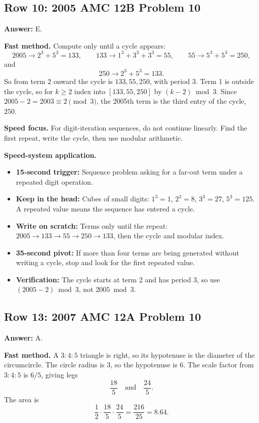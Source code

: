 \documentclass[11pt]{article}
\begin{document}
\subsection{Row 10: 2005 AMC 12B Problem 10}

\textbf{Answer:} E.

\textbf{Fast method.} Compute only until a cycle appears:
\[
2005\to 2^3+5^3=133,\qquad
133\to 1^3+3^3+3^3=55,\qquad
55\to 5^3+5^3=250,
\]
and
\[
250\to 2^3+5^3=133.
\]
So from term 2 onward the cycle is \(133,55,250\), with period 3. Term 1 is outside the cycle, so for \(k\ge2\) index into \([133,55,250]\) by \((k-2)\bmod 3\). Since \(2005-2=2003\equiv2\pmod3\), the 2005th term is the third entry of the cycle, \(250\).

\textbf{Speed focus.} For digit-iteration sequences, do not continue linearly. Find the first repeat, write the cycle, then use modular arithmetic.

\textbf{Speed-system application.}
\begin{itemize}
  \item \textbf{15-second trigger:} Sequence problem asking for a far-out term under a repeated digit operation.
  \item \textbf{Keep in the head:} Cubes of small digits: \(1^3=1\), \(2^3=8\), \(3^3=27\), \(5^3=125\). A repeated value means the sequence has entered a cycle.
  \item \textbf{Write on scratch:} Terms only until the repeat: \(2005\to133\to55\to250\to133\), then the cycle and modular index.
  \item \textbf{35-second pivot:} If more than four terms are being generated without writing a cycle, stop and look for the first repeated value.
  \item \textbf{Verification:} The cycle starts at term 2 and has period 3, so use \((2005-2)\bmod 3\), not \(2005\bmod 3\).
\end{itemize}

\subsection{Row 13: 2007 AMC 12A Problem 10}

\textbf{Answer:} A.

\textbf{Fast method.} A \(3:4:5\) triangle is right, so its hypotenuse is the diameter of the circumcircle. The circle radius is 3, so the hypotenuse is 6. The scale factor from \(3:4:5\) is \(6/5\), giving legs
\[
\frac{18}{5}\quad\text{and}\quad \frac{24}{5}.
\]
The area is
\[
\frac12\cdot\frac{18}{5}\cdot\frac{24}{5}=\frac{216}{25}=8.64.
\]
\end{document}
